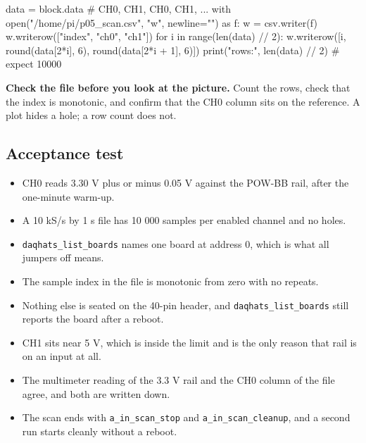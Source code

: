 \begin{steps}
\begin{pycode}
data = block.data                      # CH0, CH1, CH0, CH1, ...
with open("/home/pi/p05_scan.csv", "w", newline="") as f:
    w = csv.writer(f)
    w.writerow(["index", "ch0", "ch1"])
    for i in range(len(data) // 2):
        w.writerow([i, round(data[2*i], 6), round(data[2*i + 1], 6)])
print("rows:", len(data) // 2)         # expect 10000
\end{pycode}

\item \textbf{Check the file before you look at the picture.} Count the rows, check that the index is monotonic, and confirm that the CH0 column sits on the reference. A plot hides a hole; a row count does not.
\end{steps}

\subsection*{Acceptance test}

\begin{itemize}
\item CH0 reads 3.30 V plus or minus 0.05 V against the POW-BB rail, after the one-minute warm-up.
\item A 10 kS/s by 1 s file has 10 000 samples per enabled channel and no holes.
\item \texttt{daqhats\_list\_boards} names one board at address 0, which is what all jumpers off means.
\item The sample index in the file is monotonic from zero with no repeats.
\item Nothing else is seated on the 40-pin header, and \texttt{daqhats\_list\_boards} still reports the board after a reboot.
\item CH1 sits near 5 V, which is inside the limit and is the only reason that rail is on an input at all.
\item The multimeter reading of the 3.3 V rail and the CH0 column of the file agree, and both are written down.
\item The scan ends with \texttt{a\_in\_scan\_stop} and \texttt{a\_in\_scan\_cleanup}, and a second run starts cleanly without a reboot.
\end{itemize}

